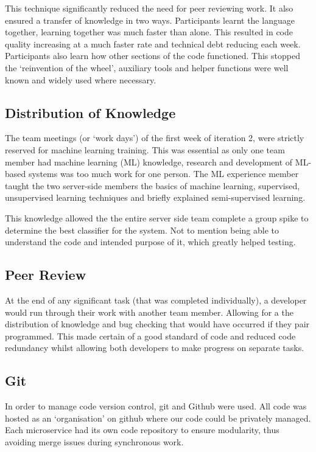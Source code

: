 This technique significantly reduced the need for peer reviewing work. It also ensured a transfer of knowledge in two ways. Participants learnt the language together, learning together was much faster than alone. This resulted in code quality increasing at a much faster rate and technical debt reducing each week. Participants also learn how other sections of the code functioned. This stopped the `reinvention of the wheel', auxiliary tools and helper functions were well known and widely used where necessary. 

\subsection{Distribution of Knowledge}
The team meetings (or `work days') of the first week of iteration 2, were strictly reserved for machine learning training. This was essential as only one team member had machine learning (ML) knowledge, research and development of ML-based systems was too much work for one person. The ML experience member taught the two server-side members the basics of machine learning, supervised, unsupervised learning techniques and briefly explained semi-supervised learning. 

This knowledge allowed the the entire server side team complete a group spike to determine the best classifier for the system. Not to mention being able to understand the code and intended purpose of it, which greatly helped testing. 


\subsection{Peer Review}
At the end of any significant task (that was completed individually), a developer would run through their work with another team member. Allowing for a the distribution of knowledge and bug checking that would have occurred if they pair programmed. This made certain of a good standard of code and reduced code redundancy whilst allowing both developers to make progress on separate tasks.

\subsection{Git}
In order to manage code version control, git and Github were used. All code was hosted as an `organisation' on github where our code could be privately managed. Each microservice had its own code repository to ensure modularity, thus avoiding merge issues during synchronous work. 

